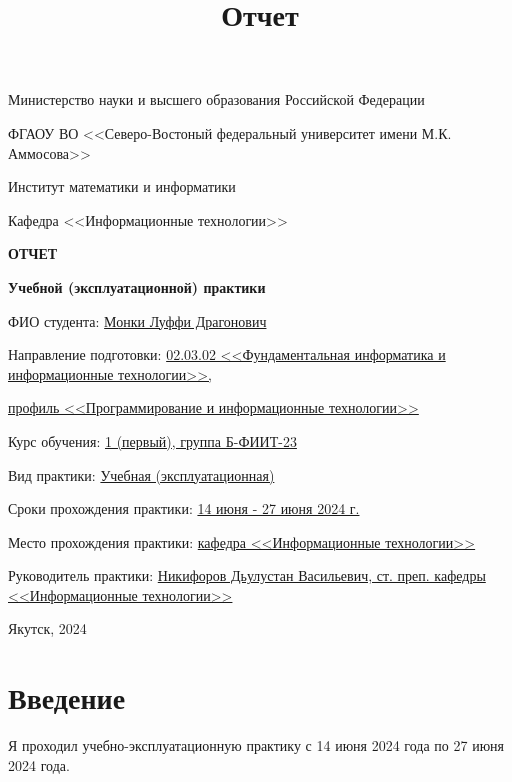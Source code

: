 \documentclass[a4paper,12pt]{article}
\title{Отчет}
\begin{document}
	\thispagestyle{empty}
	\begin{center}
			\small{Министерство науки и высшего образования Российской Федерации
			
			ФГАОУ ВО <<Северо-Востоный федеральный университет имени М.К. Аммосова>>
			
			Институт математики и информатики
			
			Кафедра <<Информационные технологии>>}
	
		\vspace{15ex}
		\textbf{ОТЧЕТ}
		
		\textbf{Учебной (эксплуатационной) практики}
	\end{center}

	\begin{flushleft}
		ФИО студента: \underline{Монки Луффи Драгонович}
		
		Направление подготовки: \underline{02.03.02 <<Фундаментальная информатика и информационные технологии>>,} 
		
		\underline{профиль <<Программирование и информационные технологии>>}
		
		Курс обучения: \underline{1 (первый), группа Б-ФИИТ-23}
		
		Вид практики: \underline{Учебная (эксплуатационная)}
		
		Сроки прохождения практики: \underline{14 июня - 27 июня 2024 г.}

		Место прохождения практики: \underline{кафедра <<Информационные технологии>>}
		
		Руководитель практики: \underline{Никифоров Дьулустан Васильевич, ст. преп. кафедры  <<Информационные технологии>>} 
		
	\end{flushleft}

	\vfill

	\begin{center}
		\small{Якутск, 2024}
	\end{center}
	\newpage
	\tableofcontents


	\newpage

	\section*{Введение}
	Я проходил учебно-эксплуатационную практику с 14 июня 2024 года по 27 июня 2024 года.
	
	
	
	
	\newpage
\end{document}
